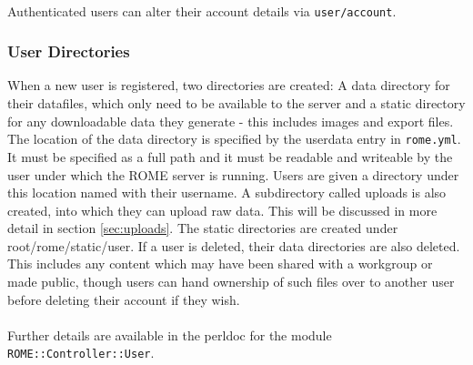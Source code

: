 \paragraph{}
Authenticated users can alter their account details via \texttt{user/account}.
 
\subsubsection{User Directories}
When a new user is registered, two directories are created: A data directory for their datafiles, which only need to be available to the server and a static directory for any downloadable data they generate - this includes images and export files. The location of the data directory is specified by the userdata entry in \texttt{rome.yml}. It must be specified as a full path and it must be readable and writeable by the user under which the ROME server is running. Users are given a directory under this location named with their username. A subdirectory called uploads is also created, into which they can upload raw data. This will be discussed in more detail in section \ref{sec:uploads}. The static directories are created under root/rome/static/user. If a user is deleted, their data directories are also deleted. This includes any content which may have been shared with a workgroup or made public, though users can hand ownership of such files over to another user before deleting their account if they wish.


\paragraph{}
Further details are available in the perldoc for the module \texttt{ROME::Controller::User}.




